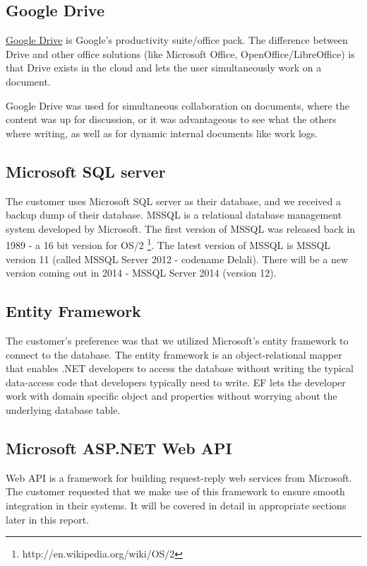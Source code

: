 \subsection{Google Drive}
\href{https://drive.google.com/}{Google Drive} is Google's productivity suite/office pack. The difference between Drive and other office solutions (like Microsoft Office, OpenOffice/LibreOffice) is that Drive exists in the cloud and lets the user simultaneously work on a document.

Google Drive was used for simultaneous collaboration on documents, where the content was up for discussion, or it was advantageous to see what the others where writing, as well as for dynamic internal documents like work logs.

\subsection{Microsoft SQL server}
The customer uses Microsoft SQL server as their database, and we received a backup dump of their database. MSSQL is a relational database management system developed by Microsoft. The first version of MSSQL was released back in 1989 - a 16 bit version for OS/2 \footnote{http://en.wikipedia.org/wiki/OS/2}. The latest version of MSSQL is MSSQL version 11 (called MSSQL Server 2012 - codename Delali). There will be a new version coming out in 2014 - MSSQL Server 2014 (version 12).

\subsection{Entity Framework}
The customer's preference was that we utilized Microsoft's entity framework to connect to the database. The entity framework is an object-relational mapper that enables .NET developers to access the database without writing the typical data-access code that developers typically need to write. EF lets the developer work with domain specific object and properties without worrying about the underlying database table.

\subsection{Microsoft ASP.NET Web API}
Web API is a framework for building request-reply web services from Microsoft. The customer requested that we make use of this framework to ensure smooth integration in their systems. It will be covered in detail in appropriate sections later in this report. 

